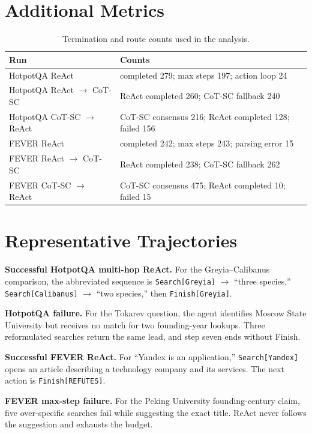 \documentclass[10pt]{article}
\newcommand{\code}[1]{\texttt{#1}}
\begin{document}
\section{Additional Metrics}

\begin{table}[htbp]
\centering
\caption{Termination and route counts used in the analysis.}
\small
\begin{tabularx}{\linewidth}{lX}
\toprule
Run & Counts \\
\midrule
HotpotQA ReAct & completed 279; max steps 197; action loop 24 \\
HotpotQA ReAct $\rightarrow$ CoT-SC & ReAct completed 260; CoT-SC fallback 240 \\
HotpotQA CoT-SC $\rightarrow$ ReAct & CoT-SC consensus 216; ReAct completed 128; failed 156 \\
FEVER ReAct & completed 242; max steps 243; parsing error 15 \\
FEVER ReAct $\rightarrow$ CoT-SC & ReAct completed 238; CoT-SC fallback 262 \\
FEVER CoT-SC $\rightarrow$ ReAct & CoT-SC consensus 475; ReAct completed 10; failed 15 \\
\bottomrule
\end{tabularx}
\end{table}

\section{Representative Trajectories}

\textbf{Successful HotpotQA multi-hop ReAct.} For the Greyia--Calibanus comparison, the abbreviated sequence is \code{Search[Greyia]} $\rightarrow$ ``three species,'' \code{Search[Calibanus]} $\rightarrow$ ``two species,'' then \code{Finish[Greyia]}.

\textbf{HotpotQA failure.} For the Tokarev question, the agent identifies Moscow State University but receives no match for two founding-year lookups. Three reformulated searches return the same lead, and step seven ends without Finish.

\textbf{Successful FEVER ReAct.} For ``Yandex is an application,'' \code{Search[Yandex]} opens an article describing a technology company and its services. The next action is \code{Finish[REFUTES]}.

\textbf{FEVER max-step failure.} For the Peking University founding-century claim, five over-specific searches fail while suggesting the exact title. ReAct never follows the suggestion and exhausts the budget.
\end{document}
